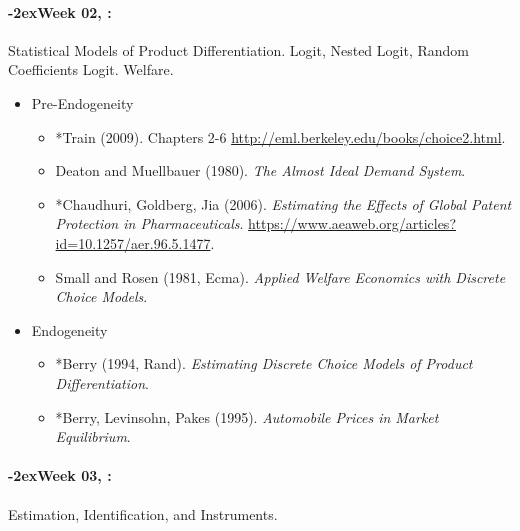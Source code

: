 \documentclass[11pt]{article}
\newcommand{\week}[1]{%
  \sbox{\weekdatebox}{\syldate{\today}}%
  \paragraph*{\kern-2ex\quad #1, \usebox{\weekdatebox}:}%
  \AdvanceDate[7]%
}
\begin{document}
\week{Week 02} Statistical Models of Product Differentiation. Logit, Nested Logit, Random Coefficients Logit. Welfare.
\begin{itemize}
\item Pre-Endogeneity
\begin{itemize}
\item *Train (2009). Chapters 2-6 \url{http://eml.berkeley.edu/books/choice2.html}.
\item Deaton and Muellbauer (1980). \textit{The Almost Ideal Demand System}.
\item *Chaudhuri, Goldberg, Jia (2006). \textit{Estimating the Effects of Global Patent Protection in Pharmaceuticals}. \url{https://www.aeaweb.org/articles?id=10.1257/aer.96.5.1477}.
\item Small and Rosen (1981, Ecma). \textit{Applied Welfare Economics with Discrete Choice Models}.
\end{itemize}
\item Endogeneity
\begin{itemize}
\item *Berry (1994, Rand). \textit{Estimating Discrete Choice Models of Product Differentiation}.
\item *Berry, Levinsohn, Pakes (1995). \textit{Automobile Prices in Market Equilibrium}.
\end{itemize}
\end{itemize}
\week{Week 03} Estimation, Identification, and Instruments.
\end{document}
